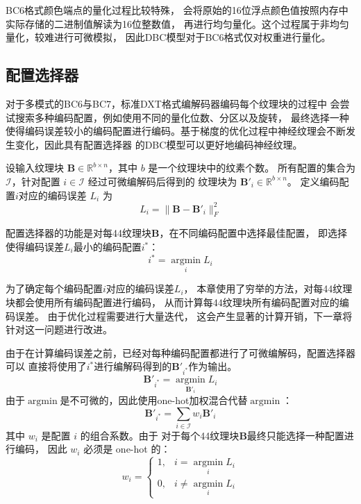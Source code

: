 BC6格式颜色端点的量化过程比较特殊，
会将原始的16位浮点颜色值按照内存中实际存储的二进制值解读为16位整数值，
再进行均匀量化。这个过程属于非均匀量化，较难进行可微模拟，
因此DBC模型对于BC6格式仅对权重进行量化。

\subsection{配置选择器}

对于多模式的BC6与BC7，标准DXT格式编解码器编码每个纹理块的过程中
会尝试搜索多种编码配置，例如使用不同的量化位数、分区以及旋转，
最终选择一种使得编码误差较小的编码配置进行编码。基于梯度的优化过程中神经纹理会不断发生变化，因此具有配置选择器
的DBC模型可以更好地编码神经纹理。

设输入纹理块 $\mathbf{B}\in\mathbb{R}^{b\times n}$，其中 $b$ 是一个纹理块中的纹素个数。
所有配置的集合为 $\mathcal{I}$，针对配置 $i\in\mathcal{I}$ 经过可微编解码后得到的
纹理块为 $\mathbf{B}'_i\in\mathbb{R}^{b\times n}$。
定义编码配置$i$对应的编码误差 $L_i$ 为
\begin{equation}
L_i=\|\mathbf{B}-\mathbf{B}'_i\|_F^2
\end{equation}

配置选择器的功能是对每4\times4纹理块$\mathbf{B}$，在不同编码配置中选择最佳配置，
即选择使得编码误差$L_i$最小的编码配置$i^*$：
\begin{equation}
    i^*=\mathop{\arg\min}\limits_{i} L_i
\end{equation}

为了确定每个编码配置$i$对应的编码误差$L_i$，
本章使用了穷举的方法，对每4\times4纹理块都会使用所有编码配置进行编码，
从而计算每4\times4纹理块所有编码配置对应的编码误差。
由于优化过程需要进行大量迭代，
这会产生显著的计算开销，下一章将针对这一问题进行改进。

由于在计算编码误差之前，已经对每种编码配置都进行了可微编解码，配置选择器可以
直接将使用了$i^*$进行编解码得到的$\mathbf{B}'_{i^*}$作为输出。
\begin{equation}
    \mathbf{B}'_{i^*}=\mathop{\arg\min}\limits_{\mathbf{B}'_i} L_i
\end{equation}
由于$\mathop{\arg\min}$是不可微的，因此使用one-hot加权混合代替$\mathop{\arg\min}$：
\begin{equation}
\mathbf{B}'_{i^*}=\sum_{i\in\mathcal{I}} w_i\mathbf{B}'_i
\end{equation}
其中 $w_i$ 是配置 $i$ 的组合系数。由于
对于每个4\times4纹理块$\mathbf{B}$最终只能选择一种配置进行编码，
因此 $w_i$ 必须是 one-hot 的：
\begin{equation}
    w_i =\left\{\begin{matrix}
        1,& i=\mathop{\arg\min}\limits_{i} L_i
        \\0,& i\ne\mathop{\arg\min}\limits_{i} L_i
        \end{matrix}\right.
\end{equation}

